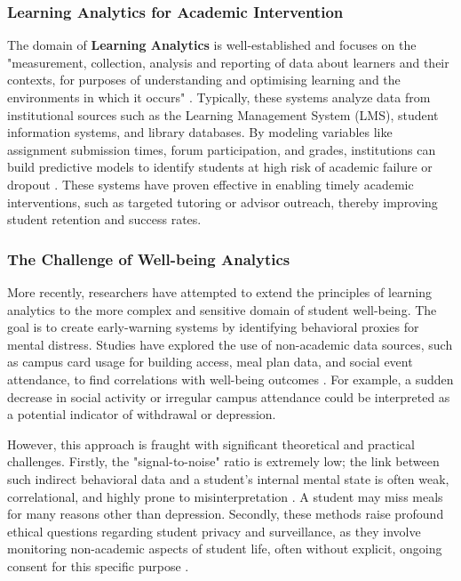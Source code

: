\subsubsection{Learning Analytics for Academic Intervention}
The domain of \textbf{Learning Analytics} is well-established and focuses on the "measurement, collection, analysis and reporting of data about learners and their contexts, for purposes of understanding and optimising learning and the environments in which it occurs" \cite{siemens2011learninganalytics}. Typically, these systems analyze data from institutional sources such as the Learning Management System (LMS), student information systems, and library databases. By modeling variables like assignment submission times, forum participation, and grades, institutions can build predictive models to identify students at high risk of academic failure or dropout \cite{banihashem2022predictivedropout}. These systems have proven effective in enabling timely academic interventions, such as targeted tutoring or advisor outreach, thereby improving student retention and success rates.

\subsubsection{The Challenge of Well-being Analytics}
More recently, researchers have attempted to extend the principles of learning analytics to the more complex and sensitive domain of student well-being. The goal is to create early-warning systems by identifying behavioral proxies for mental distress. Studies have explored the use of non-academic data sources, such as campus card usage for building access, meal plan data, and social event attendance, to find correlations with well-being outcomes \cite{paolucci2024wellbeinganalytics}. For example, a sudden decrease in social activity or irregular campus attendance could be interpreted as a potential indicator of withdrawal or depression.

However, this approach is fraught with significant theoretical and practical challenges. Firstly, the "signal-to-noise" ratio is extremely low; the link between such indirect behavioral data and a student's internal mental state is often weak, correlational, and highly prone to misinterpretation \cite{masiello2024privacyethics}. A student may miss meals for many reasons other than depression. Secondly, these methods raise profound ethical questions regarding student privacy and surveillance, as they involve monitoring non-academic aspects of student life, often without explicit, ongoing consent for this specific purpose \cite{masiello2024privacyethics,paolucci2024wellbeinganalytics}.

